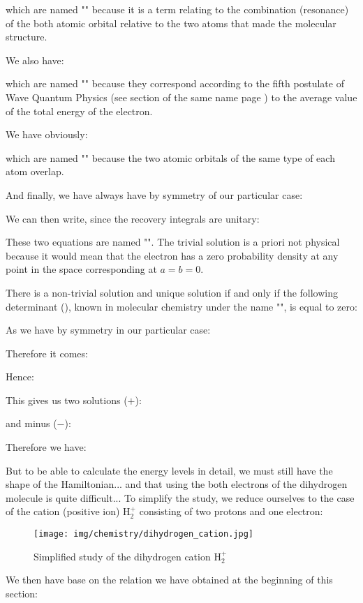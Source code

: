 	which are named "" because it is a term relating to the combination (resonance) of the both atomic orbital relative to the two atoms that made the molecular structure.

	We also have:
	
	which are named "" because they correspond according to the fifth postulate of Wave Quantum Physics (see section of the same name page \pageref{fifth postulate of wave quantum physics}) to the average value of the total energy of the electron.

	We have obviously:
	
	which are named "" because the two atomic orbitals of the same type of each atom overlap.
	
	And finally, we have always have by symmetry of our particular case:
	
	We can then write, since the recovery integrals are unitary:
	
	These two equations are named "". The trivial solution is a priori not physical because it would mean that the electron has a zero probability density at any point in the space corresponding at $a=b=0$.

	There is a non-trivial solution and unique solution if and only if the following determinant (), known in molecular chemistry under the name "", is equal to zero:
	
	As we have by symmetry in our particular case:
	
	Therefore it comes:
	
	Hence:
	
	This gives us two solutions ($+$):
	
	and minus ($-$):
	
	Therefore we have:	
	
	But to be able to calculate the energy levels in detail, we must still have the shape of the Hamiltonian... and that using the both electrons of the dihydrogen molecule is quite difficult... To simplify the study, we reduce ourselves to the case of the cation (positive ion) $\mathrm{H}_2^{+}$ consisting of two protons and one electron:
	\begin{figure}[H]
		\begin{center}
		\texttt{[image: img/chemistry/dihydrogen\_cation.jpg]}
		\end{center}	
		\caption{Simplified study of the dihydrogen cation $\mathrm{H}_2^+$}
	\end{figure}
	We then have base on the relation we have obtained at the beginning of this section:
	

